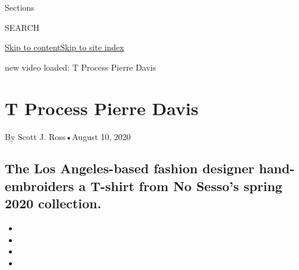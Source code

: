Sections

SEARCH

\protect\hyperlink{site-content}{Skip to
content}\protect\hyperlink{site-index}{Skip to site index}

new video loaded: T Process \textbar{} Pierre Davis

\hypertarget{t-process--pierre-davis}{%
\section{T Process \textbar{} Pierre
Davis}\label{t-process--pierre-davis}}

By Scott J. Ross•August 10, 2020

\hypertarget{the-los-angeles-based-fashion-designer-hand-embroiders-a-t-shirt-from-no-sessos-spring-2020-collection}{%
\subsection{The Los Angeles-based fashion designer hand-embroiders a
T-shirt from No Sesso's spring 2020
collection.}\label{the-los-angeles-based-fashion-designer-hand-embroiders-a-t-shirt-from-no-sessos-spring-2020-collection}}

\begin{itemize}
\item
\item
\item
\item
\end{itemize}

